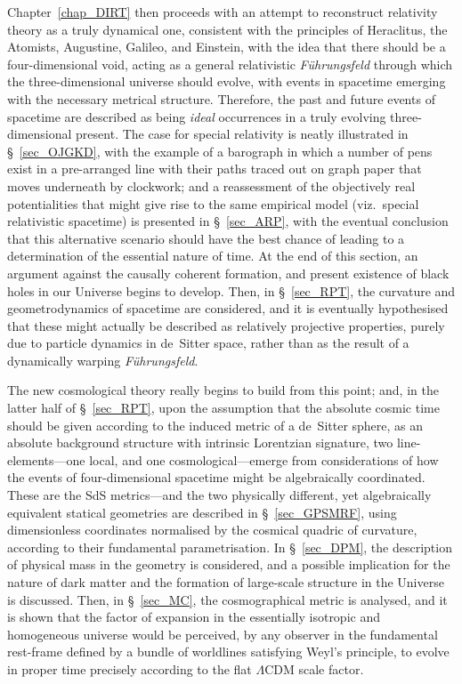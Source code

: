 Chapter~\ref{chap_DIRT} then proceeds with an attempt to reconstruct relativity theory as a truly dynamical one, consistent with the principles of Heraclitus, the Atomists, Augustine, Galileo, and Einstein, with the idea that there should be a four-dimensional void, acting as a general relativistic \textit{F\"{u}hrungsfeld} through which the three-dimensional universe should evolve, with events in spacetime emerging with the necessary metrical structure. Therefore, the past and future events of spacetime are described as being \textit{ideal} occurrences in a truly evolving three-dimensional present. The case for special relativity is neatly illustrated in \S~\ref{sec_OJGKD}, with the example of a barograph in which a number of pens exist in a pre-arranged line with their paths traced out on graph paper that moves underneath by clockwork; and a reassessment of the objectively real potentialities that might give rise to the same empirical model (viz.\ special relativistic spacetime) is presented in \S~\ref{sec_ARP}, with the eventual conclusion that this alternative scenario should have the best chance of leading to a determination of the essential nature of time. At the end of this section, an argument against the causally coherent formation, and present existence of black holes in our Universe begins to develop. Then, in \S~\ref{sec_RPT}, the curvature and geometrodynamics of spacetime are considered, and it is eventually hypothesised that these might actually be described as relatively projective properties, purely due to particle dynamics in de~Sitter space, rather than as the result of a dynamically warping \textit{F\"{u}hrungsfeld}. 

The new cosmological theory really begins to build from this point; and, in the latter half of \S~\ref{sec_RPT}, upon the assumption that the absolute cosmic time should be given according to the induced metric of a de~Sitter sphere, as an absolute background structure with intrinsic Lorentzian signature, two line-elements---one local, and one cosmological---emerge from considerations of how the events of four-dimensional spacetime might be algebraically coordinated. These are the SdS metrics---and the two physically different, yet algebraically equivalent statical geometries are described in \S~\ref{sec_GPSMRF}, using dimensionless coordinates normalised by the cosmical quadric of curvature, according to their fundamental parametrisation. In \S~\ref{sec_DPM}, the description of physical mass in the geometry is considered, and a possible implication for the nature of dark matter and the formation of large-scale structure in the Universe is discussed. Then, in \S~\ref{sec_MC}, the cosmographical metric is analysed, and it is shown that the factor of expansion in the essentially isotropic and homogeneous universe would be perceived, by any observer in the fundamental rest-frame defined by a bundle of worldlines satisfying Weyl's principle, to evolve in proper time precisely according to the flat $\Lambda$CDM scale factor. 

